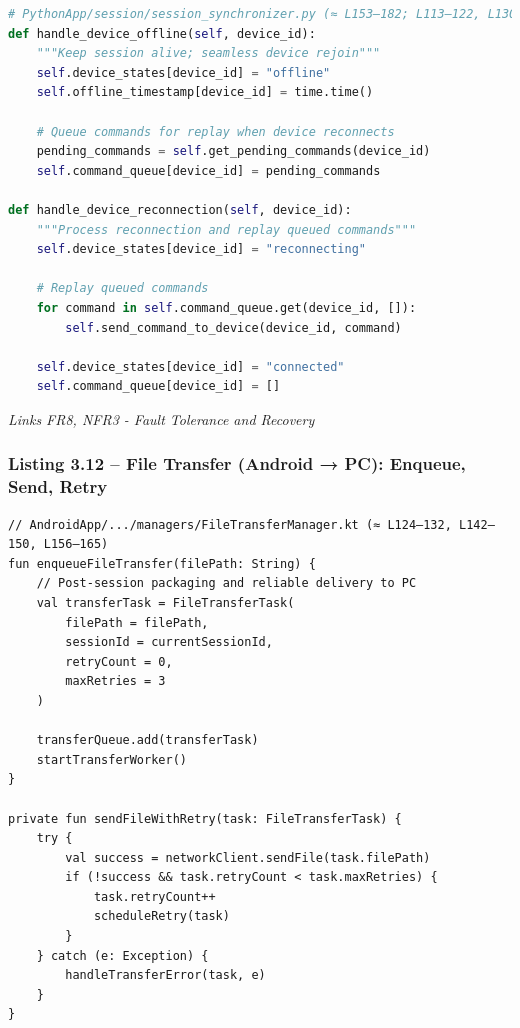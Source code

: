 \documentclass[12pt,a4paper]{article}
\begin{document}
\begin{lstlisting}[language=Python]
# PythonApp/session/session_synchronizer.py (≈ L153–182; L113–122, L130–138)
def handle_device_offline(self, device_id):
    """Keep session alive; seamless device rejoin"""
    self.device_states[device_id] = "offline"
    self.offline_timestamp[device_id] = time.time()
    
    # Queue commands for replay when device reconnects
    pending_commands = self.get_pending_commands(device_id)
    self.command_queue[device_id] = pending_commands
    
def handle_device_reconnection(self, device_id):
    """Process reconnection and replay queued commands"""
    self.device_states[device_id] = "reconnecting"
    
    # Replay queued commands
    for command in self.command_queue.get(device_id, []):
        self.send_command_to_device(device_id, command)
    
    self.device_states[device_id] = "connected"
    self.command_queue[device_id] = []
\end{lstlisting}

\emph{Links FR8, NFR3 - Fault Tolerance and Recovery}

\subsubsection{Listing 3.12 -- File Transfer (Android → PC): Enqueue, Send, Retry}\label{listing-3.12-file-transfer-android-pc-enqueue-send-retry}

\begin{lstlisting}
// AndroidApp/.../managers/FileTransferManager.kt (≈ L124–132, L142–150, L156–165)
fun enqueueFileTransfer(filePath: String) {
    // Post-session packaging and reliable delivery to PC
    val transferTask = FileTransferTask(
        filePath = filePath,
        sessionId = currentSessionId,
        retryCount = 0,
        maxRetries = 3
    )
    
    transferQueue.add(transferTask)
    startTransferWorker()
}

private fun sendFileWithRetry(task: FileTransferTask) {
    try {
        val success = networkClient.sendFile(task.filePath)
        if (!success && task.retryCount < task.maxRetries) {
            task.retryCount++
            scheduleRetry(task)
        }
    } catch (e: Exception) {
        handleTransferError(task, e)
    }
}
\end{lstlisting}
\end{document}
